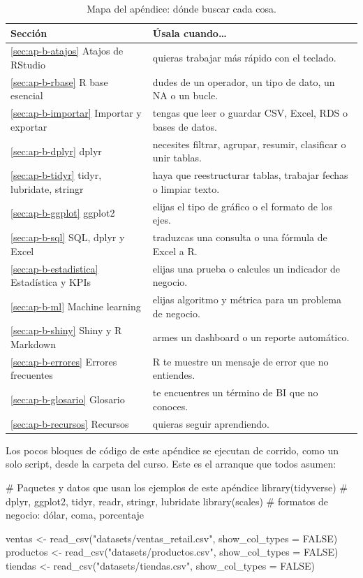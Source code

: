 \begin{table}[H]
\centering
\small
\caption{Mapa del apéndice: dónde buscar cada cosa.}
\label{tab:ap-b-mapa}
\begin{tabularx}{\textwidth}{@{}lX@{}}
\toprule
\textbf{Sección} & \textbf{Úsala cuando\ldots} \\
\midrule
\ref{sec:ap-b-atajos} Atajos de RStudio & quieras trabajar más rápido con el teclado. \\
\ref{sec:ap-b-rbase} R base esencial & dudes de un operador, un tipo de dato, un NA o un bucle. \\
\ref{sec:ap-b-importar} Importar y exportar & tengas que leer o guardar CSV, Excel, RDS o bases de datos. \\
\ref{sec:ap-b-dplyr} dplyr & necesites filtrar, agrupar, resumir, clasificar o unir tablas. \\
\ref{sec:ap-b-tidyr} tidyr, lubridate, stringr & haya que reestructurar tablas, trabajar fechas o limpiar texto. \\
\ref{sec:ap-b-ggplot} ggplot2 & elijas el tipo de gráfico o el formato de los ejes. \\
\ref{sec:ap-b-sql} SQL, dplyr y Excel & traduzcas una consulta o una fórmula de Excel a R. \\
\ref{sec:ap-b-estadistica} Estadística y KPIs & elijas una prueba o calcules un indicador de negocio. \\
\ref{sec:ap-b-ml} Machine learning & elijas algoritmo y métrica para un problema de negocio. \\
\ref{sec:ap-b-shiny} Shiny y R Markdown & armes un dashboard o un reporte automático. \\
\ref{sec:ap-b-errores} Errores frecuentes & R te muestre un mensaje de error que no entiendes. \\
\ref{sec:ap-b-glosario} Glosario & te encuentres un término de BI que no conoces. \\
\ref{sec:ap-b-recursos} Recursos & quieras seguir aprendiendo. \\
\bottomrule
\end{tabularx}
\end{table}

Los pocos bloques de código de este apéndice se ejecutan de corrido, como un
solo script, desde la carpeta del curso. Este es el arranque que todos
asumen:

\begin{rcode}[title={Arranque de cualquier análisis del curso}]
# Paquetes y datos que usan los ejemplos de este apéndice
library(tidyverse)   # dplyr, ggplot2, tidyr, readr, stringr, lubridate
library(scales)      # formatos de negocio: dólar, coma, porcentaje

ventas    <- read_csv("datasets/ventas_retail.csv", show_col_types = FALSE)
productos <- read_csv("datasets/productos.csv", show_col_types = FALSE)
tiendas   <- read_csv("datasets/tiendas.csv", show_col_types = FALSE)
\end{rcode}

